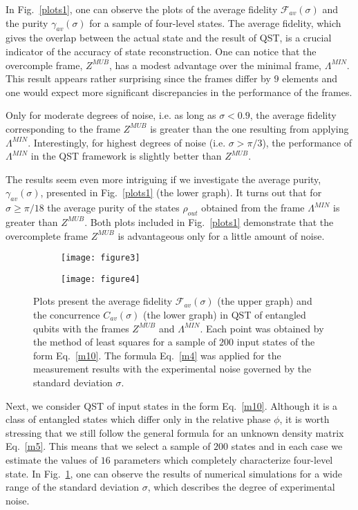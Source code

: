 \documentclass[aps,pra,reprint,groupedaddress,showkeys]{revtex4-1}
\newcommand{\figref}[1]{Fig.~\ref{#1}}
\renewcommand{\eqref}[1]{Eq.~\ref{#1}}
\begin{document}
In \figref{plots1}, one can observe the plots of the average fidelity $\mathcal{F}_{av} (\sigma)$ and the purity $\gamma_{av} (\sigma)$ for a sample of four-level states. The average fidelity, which gives the overlap between the actual state and the result of QST, is a crucial indicator of the accuracy of state reconstruction. One can notice that the overcomple frame, $Z^{MUB}$, has a modest advantage over the minimal frame, $\Lambda^{MIN}$. This result appears rather surprising since the frames differ by $9$ elements and one would expect more significant discrepancies in the performance of the frames.

Only for moderate degrees of noise, i.e. as long as $\sigma < 0.9$, the average fidelity corresponding to the frame $Z^{MUB}$ is greater than the one resulting from applying $\Lambda^{MIN}$. Interestingly, for highest degrees of noise (i.e. $\sigma > \pi/3$), the performance of $\Lambda^{MIN}$ in the QST framework is slightly better than $Z^{MUB}$.

The results seem even more intriguing if we investigate the average purity, $\gamma_{av} (\sigma)$, presented in \figref{plots1} (the lower graph). It turns out that for $\sigma \geq \pi /18$ the average purity of the states $\rho_{out}$ obtained from the frame $\Lambda^{MIN}$ is greater than $Z^{MUB}$. Both plots included in \figref{plots1} demonstrate that the overcomplete frame $Z^{MUB}$ is advantageous only for a little amount of noise.

\begin{figure}[h]
	\centering
   \begin{subfigure}
         \centering
         \texttt{[image: figure3]}
     \end{subfigure}
     \hfill
     \begin{subfigure}
         \centering
         \texttt{[image: figure4]}
     \end{subfigure}
	\caption{Plots present the average fidelity $\mathcal{F}_{av} (\sigma)$ (the upper graph) and the concurrence $C_{av} (\sigma)$ (the lower graph) in QST of entangled qubits with the frames $Z^{MUB}$ and $\Lambda^{MIN}$. Each point was obtained by the method of least squares for a sample of $200$ input states of the form \eqref{m10}. The formula \eqref{m4} was applied for the measurement results with the experimental noise governed by the standard deviation $\sigma$.}
	\label{plots2}
\end{figure}

Next, we consider QST of input states in the form \eqref{m10}. Although it is a class of entangled states which differ only in the relative phase $\phi$, it is worth stressing that we still follow the general formula for an unknown density matrix \eqref{m5}. This means that we select a sample of $200$ states and in each case we estimate the values of $16$ parameters which completely characterize four-level state. In \figref{plots2}, one can observe the results of numerical simulations for a wide range of the standard deviation $\sigma$, which describes the degree of experimental noise.
\end{document}
